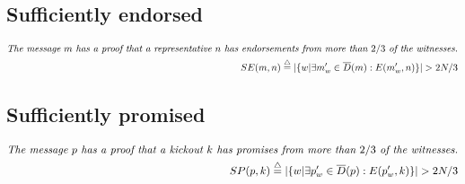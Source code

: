 \documentclass{article}
\begin{document}
\subsection*{Sufficiently endorsed}
\[
\begin{aligned}
\textit{The message $m$ has a proof that a representative $n$ has endorsements from more than $2/3$ of the witnesses.} \\
SE(m, n)  \buildrel\triangle\over = |\{w | \exists m'_w\in\overline{D}(m): E(m'_w,n) \}| > 2N/3
\end{aligned}
\]

\subsection*{Sufficiently promised}
\[
\begin{aligned}
\textit{The message $p$ has a proof that a kickout $k$ has promises from more than $2/3$ of the witnesses.} \\
SP(p, k)  \buildrel\triangle\over = |\{w | \exists p'_w\in\overline{D}(p): E(p'_w,k) \}| > 2N/3
\end{aligned}
\]
\end{document}
